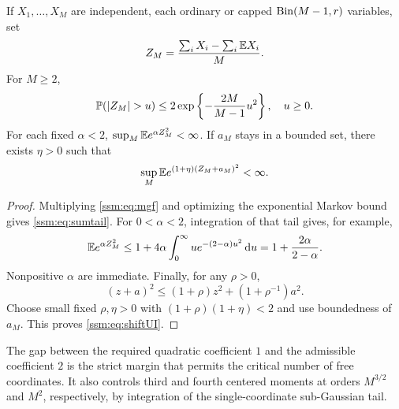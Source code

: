 \begin{corollary}\label{ssm:cor:squareUI}
If $X_1,\ldots,X_M$ are independent, each ordinary or capped $\operatorname{Bin}(M-1,r)$ variables, set
\[
 Z_M=\frac{\sum_iX_i-\sum_i\mathbb E X_i}{M}.
\]
For $M\ge2$,
\begin{equation}\label{ssm:eq:sumtail}
 \PP(|Z_M|>u)\le2\exp\left\{-\frac{2M}{M-1}u^2\right\},\quad u\ge0.
\end{equation}
For each fixed $\alpha<2$, $\sup_M\mathbb E e^{\alpha Z_M^2}<\infty$. If $a_M$ stays in a bounded set, there exists $\eta>0$ such that
\begin{equation}\label{ssm:eq:shiftUI}
 \sup_M\mathbb E e^{(1+\eta)(Z_M+a_M)^2}<\infty.
\end{equation}
\end{corollary}
\begin{proof}
Multiplying \eqref{ssm:eq:mgf} and optimizing the exponential Markov bound gives \eqref{ssm:eq:sumtail}. For $0<\alpha<2$, integration of that tail gives, for example,
\[
 \mathbb E e^{\alpha Z_M^2}
 \le1+4\alpha\int_0^\infty u e^{-(2-\alpha)u^2}\,\mathrm d u
 =1+\frac{2\alpha}{2-\alpha}.
\]
Nonpositive $\alpha$ are immediate. Finally, for any $\rho>0$,
\[
 (z+a)^2\le(1+\rho)z^2+(1+\rho^{-1})a^2.
\]
Choose small fixed $\rho,\eta>0$ with $(1+\rho)(1+\eta)<2$ and use boundedness of $a_M$. This proves \eqref{ssm:eq:shiftUI}.
\end{proof}

The gap between the required quadratic coefficient $1$ and the admissible coefficient $2$ is the strict margin that permits the critical number of free coordinates. It also controls third and fourth centered moments at orders $M^{3/2}$ and $M^2$, respectively, by integration of the single-coordinate sub-Gaussian tail.
